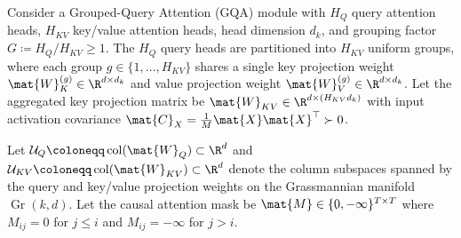 \begin{theorem}
\label{thm:simplex_conservation}
Consider a Grouped-Query Attention (GQA) module with $H_Q$ query attention heads, $H_{KV}$ key/value attention heads, head dimension $d_k$, and grouping factor $G \coloneqq H_Q / H_{KV} \ge 1$.
The $H_Q$ query heads are partitioned into $H_{KV}$ uniform groups, where each group $g \in \{1, \dots, H_{KV}\}$ shares a single key projection weight $\mat{W}_K^{(g)} \in \R^{d \times d_k}$ and value projection weight $\mat{W}_V^{(g)} \in \R^{d \times d_k}$.
Let the aggregated key projection matrix be $\mat{W}_{KV} \in \R^{d \times (H_{KV} d_k)}$ with input activation covariance $\mat{C}_X = \frac{1}{M}\mat{X}\mat{X}^\top \succ 0$.

Let $\mathcal{U}_Q \coloneqq \operatorname{col}(\mat{W}_Q) \subset \R^d$ and $\mathcal{U}_{KV} \coloneqq \operatorname{col}(\mat{W}_{KV}) \subset \R^d$ denote the column subspaces spanned by the query and key/value projection weights on the Grassmannian manifold $\operatorname{Gr}(k, d)$.
Let the causal attention mask be $\mat{M} \in \{0, -\infty\}^{T \times T}$ where $M_{ij} = 0$ for $j \le i$ and $M_{ij} = -\infty$ for $j > i$.


\end{theorem}
